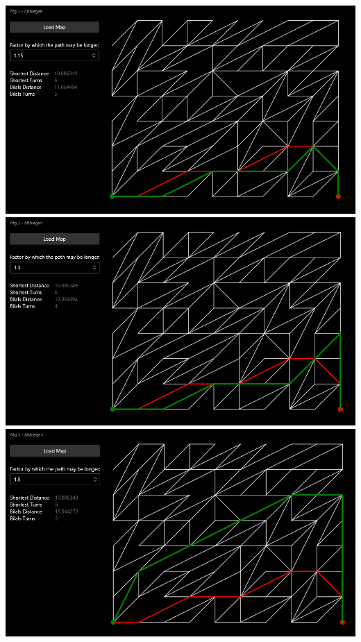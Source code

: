 \documentclass{article}
\theoremstyle{nonumberplain}
\begin{document}
\begin{center}
\includegraphics[width=\textwidth]{examples/2_15.png}
\includegraphics[width=\textwidth]{examples/2_30.png}
\includegraphics[width=\textwidth]{examples/2_50.png}
\end{center}

\subsection{}
\end{document}
